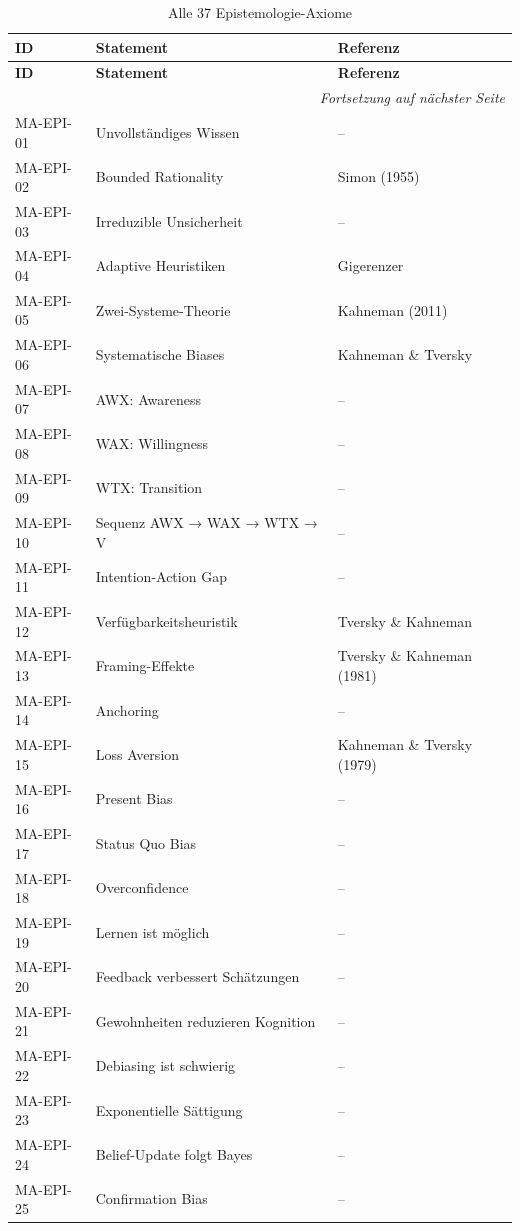 \documentclass[11pt,a4paper]{article}
\theoremstyle{definition}
\theoremstyle{plain}
\begin{document}
\begin{longtable}{@{}lll@{}}
\caption{Alle 37 Epistemologie-Axiome} \\
\toprule
\textbf{ID} & \textbf{Statement} & \textbf{Referenz} \\
\midrule
\endfirsthead
\toprule
\textbf{ID} & \textbf{Statement} & \textbf{Referenz} \\
\midrule
\endhead
\midrule
\multicolumn{3}{r}{\textit{Fortsetzung auf nächster Seite}} \\
\endfoot
\bottomrule
\endlastfoot
MA-EPI-01 & Unvollständiges Wissen & -- \\
MA-EPI-02 & Bounded Rationality & Simon (1955) \\
MA-EPI-03 & Irreduzible Unsicherheit & -- \\
MA-EPI-04 & Adaptive Heuristiken & Gigerenzer \\
MA-EPI-05 & Zwei-Systeme-Theorie & Kahneman (2011) \\
MA-EPI-06 & Systematische Biases & Kahneman \& Tversky \\
MA-EPI-07 & AWX: Awareness & -- \\
MA-EPI-08 & WAX: Willingness & -- \\
MA-EPI-09 & WTX: Transition & -- \\
MA-EPI-10 & Sequenz AWX → WAX → WTX → V & -- \\
MA-EPI-11 & Intention-Action Gap & -- \\
MA-EPI-12 & Verfügbarkeitsheuristik & Tversky \& Kahneman \\
MA-EPI-13 & Framing-Effekte & Tversky \& Kahneman (1981) \\
MA-EPI-14 & Anchoring & -- \\
MA-EPI-15 & Loss Aversion & Kahneman \& Tversky (1979) \\
MA-EPI-16 & Present Bias & -- \\
MA-EPI-17 & Status Quo Bias & -- \\
MA-EPI-18 & Overconfidence & -- \\
MA-EPI-19 & Lernen ist möglich & -- \\
MA-EPI-20 & Feedback verbessert Schätzungen & -- \\
MA-EPI-21 & Gewohnheiten reduzieren Kognition & -- \\
MA-EPI-22 & Debiasing ist schwierig & -- \\
MA-EPI-23 & Exponentielle Sättigung & -- \\
MA-EPI-24 & Belief-Update folgt Bayes & -- \\
MA-EPI-25 & Confirmation Bias & -- \\

\end{longtable}
\end{document}
